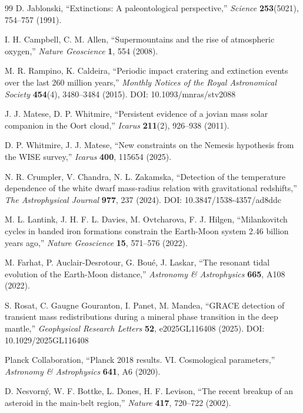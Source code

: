 \documentclass[11pt,a4paper]{article}
\begin{document}
\begin{thebibliography}{99}
		D. Jablonski, ``Extinctions: A paleontological perspective,''
		\emph{Science} \textbf{253}(5021), 754–757 (1991).
		
		I. H. Campbell, C. M. Allen, ``Supermountains and the rise of atmospheric oxygen,''
		\emph{Nature Geoscience} \textbf{1}, 554 (2008).
		
		M. R. Rampino, K. Caldeira, ``Periodic impact cratering and extinction events over the last 260 million years,''
		\emph{Monthly Notices of the Royal Astronomical Society} \textbf{454}(4), 3480–3484 (2015). DOI: 10.1093/mnras/stv2088
		
		J. J. Matese, D. P. Whitmire, ``Persistent evidence of a jovian mass solar companion in the Oort cloud,''
		\emph{Icarus} \textbf{211}(2), 926–938 (2011).
		
		D. P. Whitmire, J. J. Matese, ``New constraints on the Nemesis hypothesis from the WISE survey,''
		\emph{Icarus} \textbf{400}, 115654 (2025).
		
		N. R. Crumpler, V. Chandra, N. L. Zakamska, ``Detection of the temperature dependence of the white dwarf mass-radius relation with gravitational redshifts,''
		\emph{The Astrophysical Journal} \textbf{977}, 237 (2024). DOI: 10.3847/1538-4357/ad8ddc
		
		M. L. Lantink, J. H. F. L. Davies, M. Ovtcharova, F. J. Hilgen, ``Milankovitch cycles in banded iron formations constrain the Earth-Moon system 2.46 billion years ago,''
		\emph{Nature Geoscience} \textbf{15}, 571–576 (2022).
		
		M. Farhat, P. Auclair-Desrotour, G. Boué, J. Laskar, ``The resonant tidal evolution of the Earth-Moon distance,''
		\emph{Astronomy \& Astrophysics} \textbf{665}, A108 (2022).
		
		S. Rosat, C. Gaugne Gouranton, I. Panet, M. Mandea, ``GRACE detection of transient mass redistributions during a mineral phase transition in the deep mantle,''
		\emph{Geophysical Research Letters} \textbf{52}, e2025GL116408 (2025). DOI: 10.1029/2025GL116408
		
		Planck Collaboration, ``Planck 2018 results. VI. Cosmological parameters,''
		\emph{Astronomy \& Astrophysics} \textbf{641}, A6 (2020).
		
		D. Nesvorný, W. F. Bottke, L. Dones, H. F. Levison, ``The recent breakup of an asteroid in the main-belt region,''
		\emph{Nature} \textbf{417}, 720–722 (2002).
		

\end{thebibliography}
\end{document}
